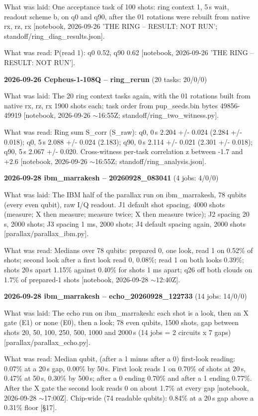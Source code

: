 \documentclass[11pt]{article}
\begin{document}
What was laid: One acceptance task of 100 shots: ring context 1, 5\,\textmu s wait, readout scheme b, on q0 and q90, after the 01 rotations were rebuilt from native rx, rz, rx {[}notebook, 2026-09-26 'THE RING -- RESULT: NOT RUN'; standoff/ring\_diag\_results.json{]}.

What was read: P(read 1): q0 0.52, q90 0.62 {[}notebook, 2026-09-26 'THE RING -- RESULT: NOT RUN'{]}.

\textbf{2026-09-26 Cepheus-1-108Q -- ring\_rerun} (20 tasks: 20/0/0)

What was laid: The 20 ring context tasks again, with the 01 rotations built from native rx, rz, rx 1900 shots each; task order from pup\_seeds.bin bytes 49856-49919 {[}notebook, 2026-09-26 \(\sim\)16:55Z; standoff/ring\_two\_witness.py{]}.

What was read: Ring sum S\_corr (S\_raw): q0, 0\,\textmu s 2.204 +/- 0.024 (2.284 +/- 0.018); q0, 5\,\textmu s 2.088 +/- 0.024 (2.183); q90, 0\,\textmu s 2.114 +/- 0.021 (2.301 +/- 0.018); q90, 5\,\textmu s 2.067 +/- 0.020. Cross-witness per-task correlation z between -1.7 and +2.6 {[}notebook, 2026-09-26 \(\sim\)16:55Z; standoff/ring\_analysis.json{]}.

\textbf{2026-09-28 ibm\_marrakesh -- 20260928\_083041} (4 jobs: 4/0/0)

What was laid: The IBM half of the parallax run on ibm\_marrakesh, 78 qubits (every even qubit), raw I/Q readout. J1 default shot spacing, 4000 shots (measure; X then measure; measure twice; X then measure twice); J2 spacing 20\,\textmu s, 2000 shots; J3 spacing 1 ms, 2000 shots; J4 default spacing again, 2000 shots {[}parallax/parallax\_ibm.py{]}.

What was read: Medians over 78 qubits: prepared 0, one look, read 1 on 0.52\% of shots; second look after a first look read 0, 0.08\%; read 1 on both looks 0.39\%; shots 20\,\textmu s apart 1.15\% against 0.40\% for shots 1 ms apart; q26 off both clouds on 1.7\% of prepared-1 shots {[}notebook, 2026-09-28 \(\sim\)12:40Z{]}.

\textbf{2026-09-28 ibm\_marrakesh -- echo\_20260928\_122733} (14 jobs: 14/0/0)

What was laid: The echo run on ibm\_marrakesh: each shot is a look, then an X gate (E1) or none (E0), then a look; 78 even qubits, 1500 shots, gap between shots 20, 50, 100, 250, 500, 1000 and 2000\,\textmu s (14 jobs = 2 circuits x 7 gaps) {[}parallax/parallax\_echo.py{]}.

What was read: Median qubit, (after a 1 minus after a 0) first-look reading: 0.07\% at a 20\,\textmu s gap, 0.00\% by 50\,\textmu s. First look reads 1 on 0.70\% of shots at 20\,\textmu s, 0.47\% at 50\,\textmu s, 0.30\% by 500\,\textmu s; after a 0 ending 0.70\% and after a 1 ending 0.77\%. After the X gate the second look reads 0 on about 1.7\% at every gap {[}notebook, 2026-09-28 \(\sim\)17:00Z{]}. Chip-wide (74 readable qubits): 0.84\% at a 20\,\textmu s gap above a 0.31\% floor {[}\S{}17{]}.
\end{document}

